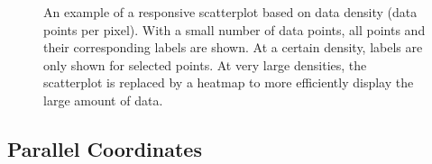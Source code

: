 \begin{figure}[tp]
\centering
{}
\hfill
{}
\hfill
{}
\caption[Responsive Scatterplot Example]
{
An example of a responsive scatterplot based on data density (data
points per pixel).  With a small
number of data points, all points and their corresponding labels are
shown.  At a certain density, labels
are only shown for selected points. 
At very large densities, the scatterplot is replaced by a heatmap to
more efficiently display the large amount of data.
}
\label{fig:RespScatterExample}
\end{figure}








\subsection{Parallel Coordinates}

